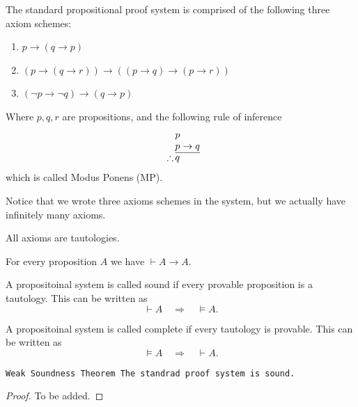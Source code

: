 \documentclass[11pt,a4paper]{article}
\DeclareRobustCommand{\models}{%
  \mathrel{\vDash}%
}
\renewcommand{\implies}{\rightarrow}
\begin{document}
\begin{definition}
  The standard propositional proof system is comprised of the
  following three axiom schemes:
  \begin{enumerate}
    \item[(1)] $p\to (q\to p)$
    \item[(2)] $(p\to (q\to r))\to ((p\to q)\to (p\to r))$
    \item[(3)] $(\neg p\to \neg q)\to (q\to p)$
  \end{enumerate}
  Where $p,q,r$ are propositions,
  and the following rule of inference
  \[
    \begin{array}{c@{\,}l@{}}
                & p         \\
                & p \to q   \\ \cline{2-2}
    \therefore  & q
    \end{array}
  \]
  which is called Modus Ponens (MP).
\end{definition}
\begin{remark}
  Notice that we wrote three axioms schemes in the system, but we
  actually have infinitely many axioms.
\end{remark}
\begin{remark}
  All axioms are tautologies.
\end{remark}

\begin{proposition}
  For every proposition $A$ we have $\vdash A \implies A$.
\end{proposition}

\begin{definition}
  A propositoinal system is called sound if every provable proposition
  is a tautology. This can be written as
  \[
    \vdash A \quad\Rightarrow\quad \models A.
  \]
\end{definition}

\begin{definition}
  A propositoinal system is called complete if every tautology is
  provable. This can be written as
  \[
    \models A \quad\Rightarrow\quad \vdash A.
  \]
\end{definition}

\begin{theorem}\label{thm:weak-soundness}\tt{Weak Soundness Theorem}
  The standrad proof system is sound.
\end{theorem}
\begin{proof}
  To be added.
\end{proof}
\end{document}
